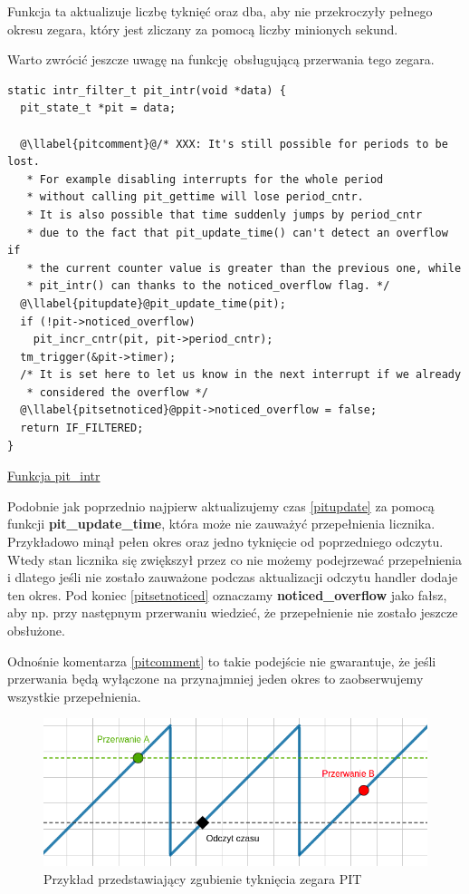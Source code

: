 \documentclass[shortabstract]{iithesis}
\makeatletter
\theoremstyle{definition} \newtheorem*{definition}{Definicja}
\theoremstyle{definition} \newtheorem*{example}{Przykład}
\theoremstyle{definition} \newtheorem*{remark}{Uwaga}
\newenvironment{longlisting}{\captionsetup{type=listing}}{}
\newcounter{llabel}[listing]%
\renewcommand*{\thellabel}{%
    \ifnum\value{llabel}<0 %
      \@ctrerr
    \else
      \ifnum\value{llabel}>10 %
        \@ctrerr
      \else
        \protect\ding{\the\numexpr\value{llabel}+201\relax}%
      \fi
    \fi
  }%
\newlength{\llabelsep}
\newcommand*{\llabel}[1]{%
  \begingroup
  \refstepcounter{llabel}%
  \label{#1}%
  \llap{\thellabel\kern\llabelsep}%
  \endgroup
}
\makeatother
\begin{document}
Funkcja ta aktualizuje liczbę tyknięć oraz dba, aby nie przekroczyły pełnego okresu zegara, który jest zliczany za pomocą liczby minionych sekund.

Warto zwrócić jeszcze uwagę na funkcję obsługującą przerwania tego zegara.

\begin{longlisting}
  \begin{verbatim}
static intr_filter_t pit_intr(void *data) {
  pit_state_t *pit = data;

  @\llabel{pitcomment}@/* XXX: It's still possible for periods to be lost.
   * For example disabling interrupts for the whole period
   * without calling pit_gettime will lose period_cntr.
   * It is also possible that time suddenly jumps by period_cntr
   * due to the fact that pit_update_time() can't detect an overflow if
   * the current counter value is greater than the previous one, while
   * pit_intr() can thanks to the noticed_overflow flag. */
  @\llabel{pitupdate}@pit_update_time(pit);
  if (!pit->noticed_overflow)
    pit_incr_cntr(pit, pit->period_cntr);
  tm_trigger(&pit->timer);
  /* It is set here to let us know in the next interrupt if we already
   * considered the overflow */
  @\llabel{pitsetnoticed}@ppit->noticed_overflow = false;
  return IF_FILTERED;
}
  \end{verbatim}
  \caption{\href{https://mimiker.ii.uni.wroc.pl/source/xref/mimiker/sys/drv/pit.c?r=2609772a\#70}{Funkcja pit\_intr}}
  \label{lst:funcpitintr}
\end{longlisting}

Podobnie jak poprzednio najpierw aktualizujemy czas \ref{pitupdate} za pomocą funkcji \textbf{pit\_update\_time}, która może nie zauważyć przepełnienia licznika. Przykładowo minął pełen okres oraz jedno tyknięcie od poprzedniego odczytu. Wtedy stan licznika się zwiększył przez co nie możemy podejrzewać przepełnienia i dlatego jeśli nie zostało zauważone podczas aktualizacji odczytu handler dodaje ten okres. Pod koniec \ref{pitsetnoticed} oznaczamy \textbf{noticed\_overflow} jako fałsz, aby np. przy następnym przerwaniu wiedzieć, że przepełnienie nie zostało jeszcze obsłużone.

Odnośnie komentarza \ref{pitcomment} to takie podejście nie gwarantuje, że jeśli przerwania będą wyłączone na przynajmniej jeden okres to zaobserwujemy wszystkie przepełnienia.

\begin{figure}[ht]
\centering
\includegraphics[scale=0.55]{images/pitinterrupt.png}
\caption{Przykład przedstawiający zgubienie tyknięcia zegara PIT}
\end{figure} 
\end{document}
